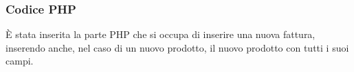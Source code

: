 \subsubsection{Codice PHP}

\`E stata inserita la parte PHP che si occupa di inserire una nuova fattura, inserendo anche, nel caso di un nuovo prodotto, il nuovo prodotto con tutti i suoi campi.



